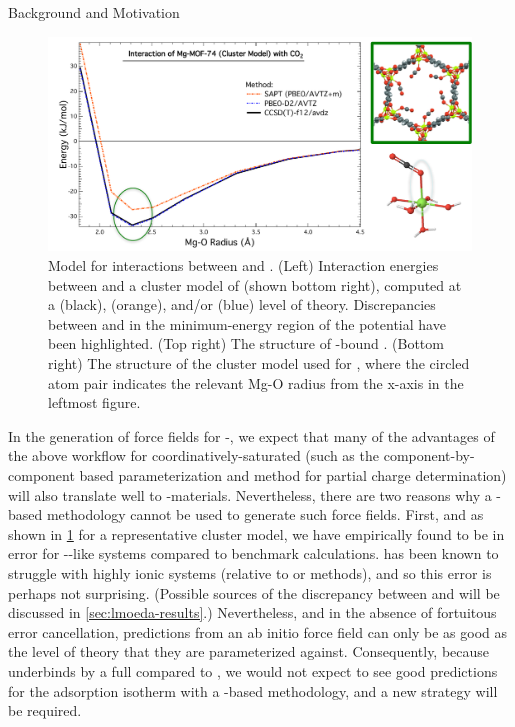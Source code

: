 \begin{section}{Background and Motivation}
    \begin{figure}
    \centering
    \includegraphics[width=1.0\textwidth]{lmoeda/sapt_breakdown.pdf}
    \caption[Model \pes for interactions between \co and \mgmof]
{
Model \pes for interactions between \co and \mgmof.  (Left) Interaction
energies between \co and a cluster model of \mgmof (shown bottom right),
computed at a \ccsdtf (black), \sapt (orange), and/or \pbeod (blue) level of
theory. Discrepancies
between \sapt and \ccsdtf in the minimum-energy region of the potential have
been highlighted. (Top right)
The structure of \co-bound \mgmof. (Bottom right) The structure of the cluster
model used for \mgmof, where the circled atom pair indicates the relevant Mg-O
radius from the x-axis in the leftmost figure.
            }
    \label{fig:lmoeda-sapt_breakdown}
    \end{figure}


In the generation of force fields for \cus-\mofs, we expect that many of the
advantages of the above workflow for coordinatively-saturated \mofs (such as the component-by-component based
parameterization and method for partial charge determination) will also translate
well to \cus-\mof materials. 
Nevertheless, there are two reasons why a \sapt-based methodology
cannot be used to generate such force fields. First, and as shown in
\cref{fig:lmoeda-sapt_breakdown} for a representative \mgmof cluster model,
we have empirically found \sapt to be in error for \cus-\mof-like systems compared to benchmark
\ccsdtf calculations. \dftsapt has been known to struggle with highly
ionic systems (relative to \ccsdt or \dft
methods),\cite{Lao2015a,Pastorczak2017} and so this error is perhaps not surprising.
(Possible sources of the discrepancy between \sapt and \ccsdtf will be
discussed in \cref{sec:lmoeda-results}.) Nevertheless, and in the absence of
fortuitous error cancellation,
predictions from an ab initio force field can only be
as good as the
level of theory that they are parameterized against. Consequently, because
\sapt underbinds \co 
by a full  compared to \ccsdtf, we would not expect to see
good predictions for the \co adsorption isotherm with a \sapt-based
methodology, and a new strategy will be required.


\end{section}
